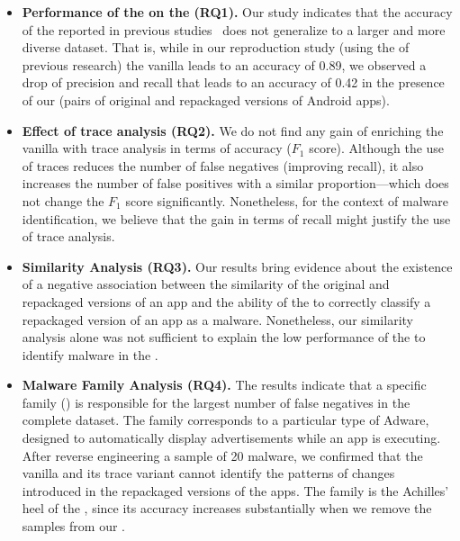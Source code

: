 \begin{itemize}
\item \textbf{Performance of the \mas on the \cds (RQ1).} 
  Our study indicates that the accuracy of the \mas reported in previous studies~\cite{DBLP:conf/wcre/BaoLL18,DBLP:journals/jss/CostaMMSSBNR22} does not
  generalize to a larger and more diverse dataset. That is, while in our
  reproduction study (using the \sds of previous research) the vanilla \mas
  leads to an accuracy of 0.89, we observed a drop of precision and recall
  that leads to an accuracy of 0.42 in the presence of our \cds (\apps pairs of
  original and repackaged versions of Android apps). 

\item \textbf{Effect of trace analysis (RQ2).} We do not find any gain of enriching the vanilla \mas with
  trace analysis in terms of accuracy ($F_1$ score). Although the use of traces
  reduces the number of false negatives (improving recall), it also increases the number of false
  positives with a similar proportion---which does not change the $F_1$ score significantly.
  Nonetheless, for the context of malware identification, we believe that the
  gain in terms of recall might justify the use of trace analysis.

\item \textbf{Similarity Analysis (RQ3).} Our results bring evidence about the existence of a negative
  association between the similarity of the original and repackaged versions of an app
  and the ability of the \mas to correctly
  classify a repackaged version of an app as a malware. Nonetheless,
  our similarity analysis alone was not sufficient to explain the low
  performance of the \mas to identify malware in the \cds.

\item \textbf{Malware Family Analysis (RQ4).} The results indicate that a specific family
  (\gps)  is responsible for the largest number of false
  negatives in the complete dataset. The \gps family corresponds to a particular type of
  Adware, designed to automatically display advertisements while an app is executing. After reverse engineering
  a sample of 20 \gps malware, we confirmed that the vanilla \mas and its trace variant cannot identify the
  patterns of changes introduced in the repackaged versions of the apps. The \gps family
  is the Achilles' heel of the \mas, since its accuracy increases substantially
  when we remove the \gps samples from our \cds.  
\end{itemize}


